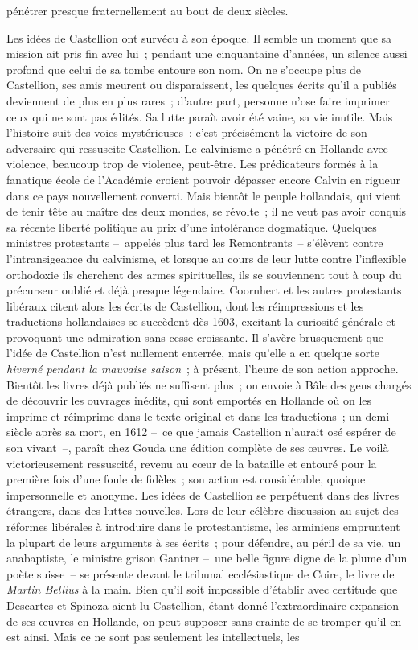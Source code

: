 \documentclass[french,twoside]{book} %
\newcommand{\astermono}{\medskip\centerline{\color{rubric}\large\selectfont{\syms ✻}}\medskip\par}%
\begin{document}
pénétrer presque fraternellement au bout de deux siècles.\par

\astermono

\noindent Les idées de Castellion ont survécu à son époque. Il semble un moment que sa mission ait pris fin avec lui ; pendant une cinquantaine d’années, un silence aussi profond que celui de sa tombe entoure son nom. On ne s’occupe plus de Castellion, ses amis meurent ou disparaissent, les quelques écrits qu’il a publiés deviennent de plus en plus rares ; d’autre part, personne n’ose faire imprimer ceux qui ne sont pas édités. Sa lutte paraît avoir été vaine, sa vie inutile. Mais l’histoire suit des voies mystérieuses : c’est précisément la victoire de son adversaire qui ressuscite Castellion. Le calvinisme a pénétré en Hollande avec violence, beaucoup trop de violence, peut-être. Les prédicateurs formés à la fanatique école de l’Académie croient pouvoir dépasser encore Calvin en rigueur dans ce pays nouvellement converti. Mais bientôt le peuple hollandais, qui vient de tenir tête au maître des deux mondes, se révolte ; il ne veut pas avoir conquis sa récente liberté politique au prix d’une intolérance dogmatique. Quelques ministres protestants – appelés plus tard les Remontrants – s’élèvent contre l’intransigeance du calvinisme, et lorsque au cours de leur lutte contre l’inflexible orthodoxie ils cherchent des armes spirituelles, ils se souviennent tout à coup du précurseur oublié et déjà presque légendaire. Coornhert et les autres protestants libéraux citent alors les écrits de Castellion, dont les réimpressions et les traductions hollandaises se succèdent dès 1603, excitant la curiosité générale et provoquant une admiration sans cesse croissante. Il s’avère brusquement que l’idée de Castellion n’est nullement enterrée, mais qu’elle a en quelque sorte \emph{hiverné pendant la mauvaise saison} ; à présent, l’heure de son action approche. Bientôt les livres déjà publiés ne suffisent plus ; on envoie à Bâle des gens chargés de découvrir les ouvrages inédits, qui sont emportés en Hollande où on les imprime et réimprime dans le texte original et dans les traductions ; un demi-siècle après sa mort, en 1612 – ce que jamais Castellion n’aurait osé espérer de son vivant –, paraît chez Gouda une édition complète de ses œuvres. Le voilà victorieusement ressuscité, revenu au cœur de la bataille et entouré pour la première fois d’une foule de fidèles ; son action est considérable, quoique impersonnelle et anonyme. Les idées de Castellion se perpétuent dans des livres étrangers, dans des luttes nouvelles. Lors de leur célèbre discussion au sujet des réformes libérales à introduire dans le protestantisme, les arminiens empruntent la plupart de leurs arguments à ses écrits ; pour défendre, au péril de sa vie, un anabaptiste, le ministre grison Gantner – une belle figure digne de la plume d’un poète suisse – se présente devant le tribunal ecclésiastique de Coire, le livre de \emph{Martin Bellius} à la main. Bien qu’il soit impossible d’établir avec certitude que Descartes et Spinoza aient lu Castellion, étant donné l’extraordinaire expansion de ses œuvres en Hollande, on peut supposer sans crainte de se tromper qu’il en est ainsi. Mais ce ne sont pas seulement les intellectuels, les 
\end{document}
